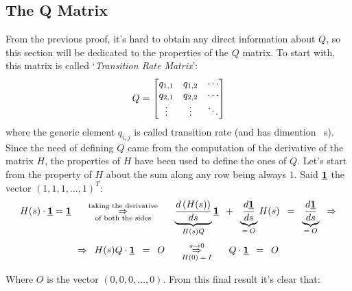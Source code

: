 \documentclass[12pt,a4paper]{article}
\begin{document}
\subsection{The Q Matrix}
From the previous proof, it's hard to obtain any direct information about $Q$, so this section will be dedicated to the properties of the $Q$ matrix. To start with, this matrix is called `\emph{Transition Rate Matrix}':
$$
Q=\left[
\begin{matrix}
q_{1,1} & q_{1,2} &  \cdots \cr
q_{2,1} & q_{2,2} &  \cdots \cr
\vdots & \vdots &  \ddots
\end{matrix}
\right]
$$
where the generic element $q_{i,j}$ is called transition rate (and has dimention \si{\per\second}). Since the need of defining $Q$ came from the computation of the derivative of the matrix $H$, the properties of $H$ have been used to define the ones of $Q$. Let's start from the property of $H$ about the sum along any row being always $1$. Said $\textrm{\underline{\textbf{1}}}$ 
the vector $(1,1,1,\dots,1)^T$:
$$
H(s)\cdot \textrm{\underline{\textbf{1}}} = \textrm{\underline{\textbf{1}}}
\hspace{15pt}
\overset{\textrm{taking the derivative}}{\underset{\textrm{of both the sides}}{\Rightarrow}}
\hspace{15pt}
\underbrace{\frac{d\left(H(s)\right)}{ds}}_{H(s)Q}\textrm{\underline{\textbf{1}}}
\hspace{5pt}+\hspace{5pt}
\underbrace{\frac{d\textrm{\underline{\textbf{1}}}}{ds}}_{
=\hspace{2pt}O}H(s)
\hspace{5pt}=\hspace{5pt}
\underbrace{\frac{d\textrm{\underline{\textbf{1}}}}{ds}}_{=\hspace{2pt}O}
\hspace{5pt}\Rightarrow
$$
$$
\Rightarrow\hspace{5pt}
H(s)Q\cdot \textrm{\underline{\textbf{1}}}\hspace{5pt}=\hspace{5pt}O
\hspace{15pt}
\overset{s\rightarrow 0}{\underset{H(0)\hspace{2pt}=\hspace{2pt}I}{\Rightarrow}}
\hspace{15pt}
Q\cdot \textrm{\underline{\textbf{1}}}\hspace{5pt}=\hspace{5pt}O
$$

\bigskip
\noindent
Where $O$ is the vector $\left(0,0,0,\dots,0\right)$. From this final result it's clear that:
\end{document}
